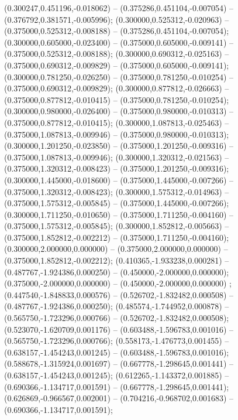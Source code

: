  (0.300247,0.451196,-0.018062) -- (0.375286,0.451104,-0.007054) -- (0.376792,0.381571,-0.005996);
 (0.300000,0.525312,-0.020963) -- (0.375000,0.525312,-0.008188) -- (0.375286,0.451104,-0.007054);
 (0.300000,0.605000,-0.023400) -- (0.375000,0.605000,-0.009141) -- (0.375000,0.525312,-0.008188);
 (0.300000,0.690312,-0.025163) -- (0.375000,0.690312,-0.009829) -- (0.375000,0.605000,-0.009141);
 (0.300000,0.781250,-0.026250) -- (0.375000,0.781250,-0.010254) -- (0.375000,0.690312,-0.009829);
 (0.300000,0.877812,-0.026663) -- (0.375000,0.877812,-0.010415) -- (0.375000,0.781250,-0.010254);
 (0.300000,0.980000,-0.026400) -- (0.375000,0.980000,-0.010313) -- (0.375000,0.877812,-0.010415);
 (0.300000,1.087813,-0.025463) -- (0.375000,1.087813,-0.009946) -- (0.375000,0.980000,-0.010313);
 (0.300000,1.201250,-0.023850) -- (0.375000,1.201250,-0.009316) -- (0.375000,1.087813,-0.009946);
 (0.300000,1.320312,-0.021563) -- (0.375000,1.320312,-0.008423) -- (0.375000,1.201250,-0.009316);
 (0.300000,1.445000,-0.018600) -- (0.375000,1.445000,-0.007266) -- (0.375000,1.320312,-0.008423);
 (0.300000,1.575312,-0.014963) -- (0.375000,1.575312,-0.005845) -- (0.375000,1.445000,-0.007266);
 (0.300000,1.711250,-0.010650) -- (0.375000,1.711250,-0.004160) -- (0.375000,1.575312,-0.005845);
 (0.300000,1.852812,-0.005663) -- (0.375000,1.852812,-0.002212) -- (0.375000,1.711250,-0.004160);
 (0.300000,2.000000,0.000000) -- (0.375000,2.000000,0.000000) -- (0.375000,1.852812,-0.002212);
 (0.410365,-1.933238,0.000281) -- (0.487767,-1.924386,0.000250) -- (0.450000,-2.000000,0.000000);
 (0.375000,-2.000000,0.000000) -- (0.450000,-2.000000,0.000000) ;
 (0.447540,-1.848833,0.000576) -- (0.526702,-1.832482,0.000508) -- (0.487767,-1.924386,0.000250);
 (0.485574,-1.744952,0.000878) -- (0.565750,-1.723296,0.000766) -- (0.526702,-1.832482,0.000508);
 (0.523070,-1.620709,0.001176) -- (0.603488,-1.596783,0.001016) -- (0.565750,-1.723296,0.000766);
 (0.558173,-1.476773,0.001455) -- (0.638157,-1.454243,0.001245) -- (0.603488,-1.596783,0.001016);
 (0.588678,-1.315924,0.001697) -- (0.667778,-1.298645,0.001441) -- (0.638157,-1.454243,0.001245);
 (0.612265,-1.143372,0.001885) -- (0.690366,-1.134717,0.001591) -- (0.667778,-1.298645,0.001441);
 (0.626869,-0.966567,0.002001) -- (0.704216,-0.968702,0.001683) -- (0.690366,-1.134717,0.001591);
